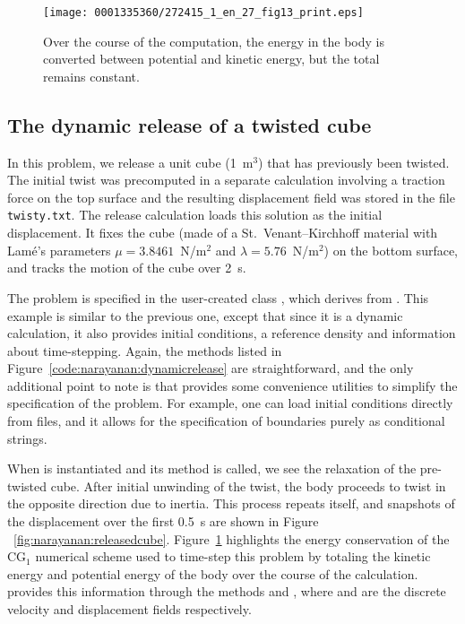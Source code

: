 \begin{figure}[!t]
  \centering
  \texttt{[image: 0001335360/272415\_1\_en\_27\_fig13\_print.eps]}
  \caption{Over the course of the computation, the energy in the body
    is converted between potential and kinetic energy, but the total
    remains constant.}
  \label{fig:narayanan:energies}
\end{figure}

\subsection{The dynamic release of a twisted cube}

In this problem, we release a unit cube (1~m$^3$) that has previously
been twisted. The initial twist was precomputed in a separate
calculation involving a traction force on the top surface and the
resulting displacement field was stored in the file {\tt
twisty.txt}. The release calculation loads this solution as the
initial displacement. It fixes the cube (made of a
St.~Venant--Kirchhoff material with Lam\'e's parameters $\mu =
3.8461$~N/m$^2$ and $\lambda = 5.76$~N/m$^2$) on the bottom surface,
and tracks the motion of the cube over 2~s.

The problem is specified in the user-created class ,
which derives from . This example is similar to
the previous one, except that since it is a dynamic calculation, it also
provides initial conditions, a reference density and information about
time-stepping. Again, the methods listed in
Figure~\ref{code:narayanan:dynamicrelease} are straightforward, and
the only additional point to note is that \twist{} provides some
convenience utilities to simplify the specification of the
problem. For example, one can load initial conditions directly from
files, and it allows for the specification of boundaries purely as
conditional strings.

When  is\enlargethispage{12pt} instantiated and its  method is
called, we see the relaxation of the pre-twisted cube. After initial
unwinding of the twist, the body proceeds to twist in the opposite
direction due to inertia. This process repeats itself, and snapshots
of the displacement over the first 0.5~s are shown in Figure%
~\ref{fig:narayanan:releasedcube}. Figure~\ref{fig:narayanan:energies}
highlights the energy conservation of the CG$_{1}$ numerical scheme
used to time-step this problem by totaling the kinetic energy and
potential energy of the body over the course of the
calculation. \twist{} provides this information through the methods
 and , where 
and  are the discrete velocity and displacement fields
respectively.


